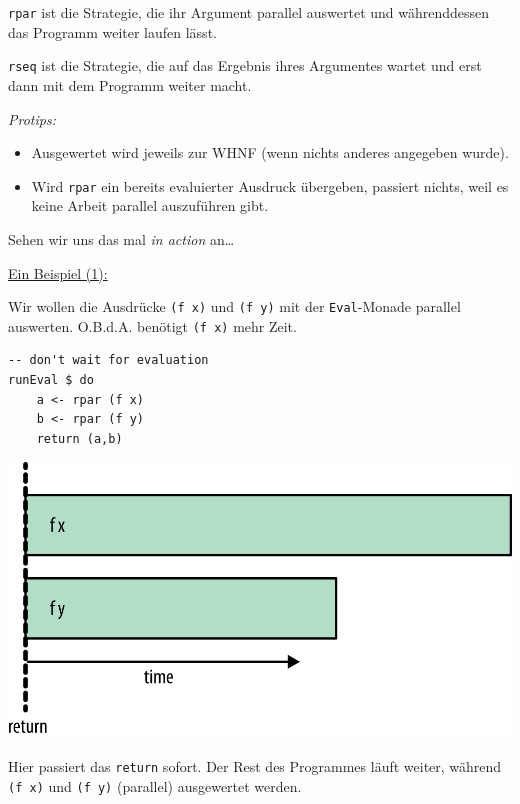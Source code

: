 \documentclass{beamer}
\begin{document}

\begin{frame}[fragile]
\texttt{rpar} ist die Strategie, die ihr Argument parallel auswertet und währenddessen das Programm weiter laufen lässt.
\bigskip\pause

\texttt{rseq} ist die Strategie, die auf das Ergebnis ihres Argumentes wartet und erst dann mit dem Programm weiter macht.
\bigskip\pause

\emph{Protips:}\pause
\begin{itemize}
\item Ausgewertet wird jeweils zur WHNF (wenn nichts anderes angegeben wurde).\pause
\item Wird \texttt{rpar} ein bereits evaluierter Ausdruck übergeben, passiert nichts,
weil es keine Arbeit parallel auszuführen gibt. \pause
\end{itemize}
\bigskip

Sehen wir uns das mal \emph{in action} an\dots
\end{frame}



\begin{frame}[fragile]
\underline{Ein Beispiel (1):}\smallskip

Wir wollen die Ausdrücke \texttt{(f x)} und \texttt{(f y)} mit der \texttt{Eval}-Monade parallel auswerten. O.B.d.A. benötigt \texttt{(f x)} mehr Zeit.\pause

\begin{multicols}{2}
\begin{verbatim}
-- don't wait for evaluation
runEval $ do
    a <- rpar (f x)
    b <- rpar (f y)
    return (a,b)
\end{verbatim}
\columnbreak
\pause
\includegraphics[scale=0.7]{evalmonad_01.png}
\end{multicols}
\pause

Hier passiert das \texttt{return} sofort. Der Rest des Programmes läuft weiter, während \texttt{(f x)} und \texttt{(f y)} (parallel) ausgewertet werden.
\end{frame}
\end{document}
